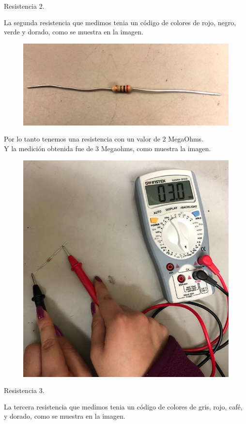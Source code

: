 \documentclass[12pt,a4paper]{report}
\begin{document}
\begin{flushleft}
	\begin{large}
		\vspace*{2cm}
		Resistencia 2.\\
	\end{large}
	La segunda resistencia que medimos tenia un c\'odigo de colores de rojo, negro, verde y dorado, como se muestra en la imagen.\\
	
\begin{figure}[H]
	\centering
	\includegraphics[width=0.4\linewidth]{resistencia2}
	\label{fig:resistencia2}
\end{figure}
 	Por lo tanto tenemos una resistencia con un valor de 2 MegaOhms.\\
 	Y la medici\'on obtenida fue de 3 Megaohms, como muestra la imagen.\\
 	\begin{figure}[H]
 		\centering
 		\includegraphics[width=0.3\linewidth]{medicion2}
 		\label{fig:medicion2}
 	\end{figure}
 	
 		\begin{large}
 		\vspace*{2cm}
 		Resistencia 3.\\
 	\end{large}
 	La tercera resistencia que medimos tenia un c\'odigo de colores de gris, rojo, caf\'e, y dorado, como se muestra en la imagen.\\
 	

\end{flushleft}
\end{document}
